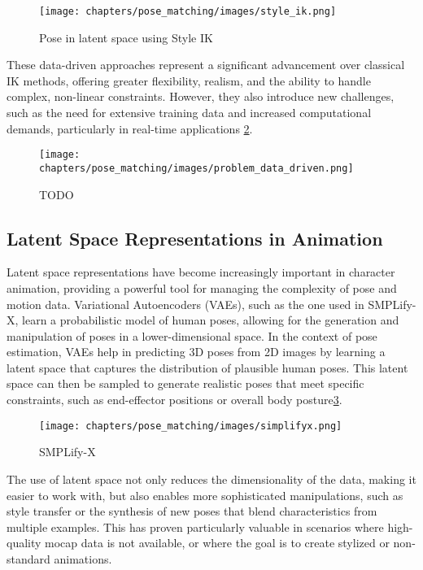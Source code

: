 \documentclass[../../main.tex]{subfiles}
\begin{document}
\begin{figure}
  \centering \texttt{[image: chapters/pose\_matching/images/style\_ik.png]}
  \caption{Pose in latent space using Style IK}
  \label{fig:style_ik}
\end{figure}

These data-driven approaches represent a significant advancement over classical IK methods, offering greater flexibility, realism, and the ability to handle complex, non-linear constraints. However, they also introduce new challenges, such as the need for extensive training data and increased computational demands, particularly in real-time applications \ref{fig:problem_data_driven}.

\begin{figure}
  \centering \texttt{[image: chapters/pose\_matching/images/problem\_data\_driven.png]}
  \caption{TODO}
  \label{fig:problem_data_driven}
\end{figure}

\subsection{Latent Space Representations in Animation}
\label{ch:pose_matching:related_work:latent_space}

Latent space representations have become increasingly important in character animation, providing a powerful tool for managing the complexity of pose and motion data. Variational Autoencoders (VAEs)\cite{TODO}, such as the one used in SMPLify-X\cite{TODO}, learn a probabilistic model of human poses, allowing for the generation and manipulation of poses in a lower-dimensional space. In the context of pose estimation, VAEs help in predicting 3D poses from 2D images by learning a latent space that captures the distribution of plausible human poses. This latent space can then be sampled to generate realistic poses that meet specific constraints, such as end-effector positions or overall body posture\ref{fig:simplifyx}.

\begin{figure}
  \centering \texttt{[image: chapters/pose\_matching/images/simplifyx.png]}
  \caption{SMPLify-X}
  \label{fig:simplifyx}
\end{figure}

The use of latent space not only reduces the dimensionality of the data, making it easier to work with, but also enables more sophisticated manipulations, such as style transfer or the synthesis of new poses that blend characteristics from multiple examples. This has proven particularly valuable in scenarios where high-quality mocap data is not available, or where the goal is to create stylized or non-standard animations.
\end{document}
